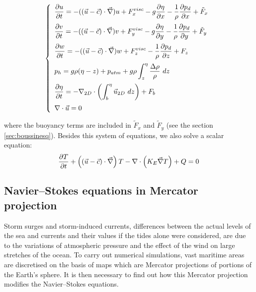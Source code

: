\begin{equation}
  \left\{\begin{array}{l}
    \displaystyle{\dfrac{\partial u}{\partial t} = - ((\vec{u}-\vec{c})\cdot\Grad)u + F_x^{visc} - g\dfrac{\partial\eta}{\partial x} - \dfrac{1}{\rho}\dfrac{\partial p_d}{\partial x} + \tilde{F}_x}
    \notag \medskip\\
    \displaystyle{\dfrac{\partial v}{\partial t} = - ((\vec{u}-\vec{c})\cdot\Grad)v + F_y^{visc} - g\dfrac{\partial\eta}{\partial y} - \dfrac{1}{\rho}\dfrac{\partial p_d}{\partial y} + \tilde{F}_y}
    \notag \medskip\\
    \displaystyle{\dfrac{\partial w}{\partial t} = - ((\vec{u}-\vec{c})\cdot\Grad)w + F_z^{visc} - \dfrac{1}{\rho}\dfrac{\partial p_d}{\partial z} + F_z}
    \notag \medskip\\
    \displaystyle{p_h = g\rho(\eta-z) + p_{atm} + g\rho\int_z^\eta\dfrac{\Delta\rho}{\rho}~dz}\medskip\\
    \displaystyle{\dfrac{\partial\eta}{\partial t} = - \DivD\left(\int_b^\eta\vec{u}_{2D}~dz\right)+ F_b}
    \notag \medskip\\
    \displaystyle{\Div\vec{u} = 0}
  \end{array}\right.
  \label{eq:NS_FS_expanded}
\end{equation}

where the buoyancy terms are included in $\tilde{F}_x$ and $\tilde{F}_y$ (see the section \ref{sec:boussinesq}). Besides this system of equations, we also solve
a scalar equation:
\begin{equation}
\dfrac{\partial T}{\partial t}+\left((\vec{u}-\vec{c})\cdot\vec \nabla\right)T - \nabla \cdot\left(K_{E}\vec \nabla T\right)+Q=0
\label{eq:scalarEquation}
\end{equation}

\subsection{Navier--Stokes equations in Mercator projection%
  }

Storm surges and storm-induced currents, differences between the actual levels
of the sea and currents and their values if the tides alone were considered,
are due to the variations of atmospheric pressure and the effect of the wind
on large stretches of the ocean. To carry out numerical simulations, vast
maritime areas are discretised on the basis of maps which are Mercator
projections of portions of the Earth's sphere. It is then necessary to find
out how this Mercator projection modifies the Navier--Stokes equations.

